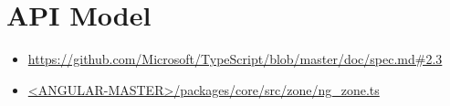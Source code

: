 \section{API Model}







\begin{itemize}
  \item \url{https://github.com/Microsoft/TypeScript/blob/master/doc/spec.md#2.3}
\end{itemize}



\begin{itemize}
  \item \href{https://github.com/angular/angular/blob/master/packages/core/src/zone/ng_zone.ts}
        {<ANGULAR-MASTER>/packages/core/src/zone/ng\_zone.ts}
\end{itemize}




